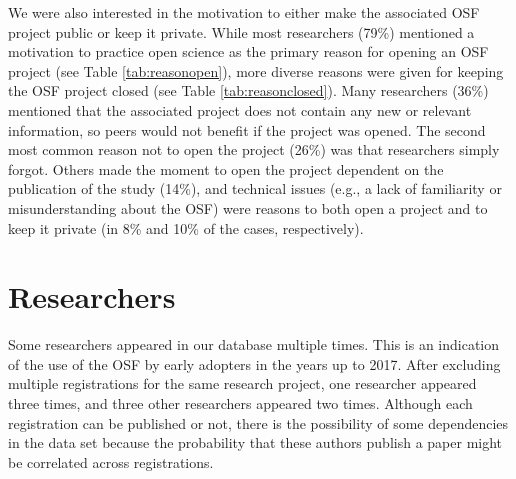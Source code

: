 \documentclass[
  ,jou, a4paper,floatsintext]{apa6}
\begin{document}
We were also interested in the motivation to either make the associated OSF project public or keep it private. While most researchers (79\%) mentioned a motivation to practice open science as the primary reason for opening an OSF project (see Table \ref{tab:reasonopen}), more diverse reasons were given for keeping the OSF project closed (see Table \ref{tab:reasonclosed}). Many researchers (36\%) mentioned that the associated project does not contain any new or relevant information, so peers would not benefit if the project was opened. The second most common reason not to open the project (26\%) was that researchers simply forgot. Others made the moment to open the project dependent on the publication of the study (14\%), and technical issues (e.g., a lack of familiarity or misunderstanding about the OSF) were reasons to both open a project and to keep it private (in 8\% and 10\% of the cases, respectively).

\hypertarget{researchers}{%
\section{Researchers}\label{researchers}}

Some researchers appeared in our database multiple times. This is an indication of the use of the OSF by early adopters in the years up to 2017. After excluding multiple registrations for the same research project, one researcher appeared three times, and three other researchers appeared two times. Although each registration can be published or not, there is the possibility of some dependencies in the data set because the probability that these authors publish a paper might be correlated across registrations.
\end{document}
